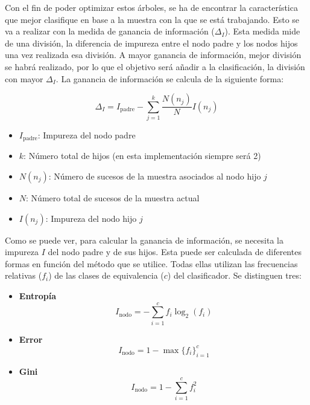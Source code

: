 \documentclass[12pt]{report}\usepackage[]{graphicx}\usepackage[dvipsnames]{xcolor}
\begin{document}
\begin{enumerate}[label = \textbf{\arabic*.}]
	 				Con el fin de poder optimizar estos árboles, se ha de encontrar la característica que mejor clasifique en base a la muestra con la que se está trabajando. Esto se va a realizar con la medida de ganancia de información ($\Delta_I$). Esta medida mide de una división, la diferencia de impureza entre el nodo padre y los nodos hijos una vez realizada esa división. A mayor ganancia de información, mejor división se habrá realizado, por lo que el objetivo será añadir a la clasificación, la división con mayor $\Delta_I$. La ganancia de información se calcula de la siguiente forma:
	 				
	 				$$
	 				\Delta_I = I_{\text{padre}} - \sum_{j=1}^k \frac{N(n_j)}{N} I(n_j)
 					$$
	 				
	 				\begin{itemize}
	 					\item $I_{\text{padre}}$: Impureza del nodo padre
	 					\item $k$: Número total de hijos (en esta implementación siempre será 2)
	 					\item $N(n_j)$: Número de sucesos de la muestra asociados al nodo hijo $j$
	 					\item $N$: Número total de sucesos de la muestra actual
	 					\item $I(n_j)$: Impureza del nodo hijo $j$
	 				\end{itemize}
	 				
	 				Como se puede ver, para calcular la ganancia de información, se necesita la impureza $I$ del nodo padre y de sus hijos. Esta puede ser calculada de diferentes formas en función del método que se utilice. Todas ellas utilizan las frecuencias relativas ($f_i$) de las clases de equivalencia ($c$) del clasificador. Se distinguen tres:
	 				
	 				\begin{itemize}
	 					\item \textbf{Entropía}
 						$$
 						I_{\text{nodo}} = - \sum_{i=1}^{c} f_i \log_2(f_i)
 						$$
	 					
	 					\item \textbf{Error}
 						$$
 						I_{\text{nodo}} = 1 - \max\{f_i\}_{i=1}^c
 						$$
	 					
	 					\item \textbf{Gini}
 						$$
 						I_{\text{nodo}} = 1 - \sum_{i=1}^{c} f_i^2
 						$$
	 				\end{itemize}
	 				

\end{enumerate}
\end{document}
